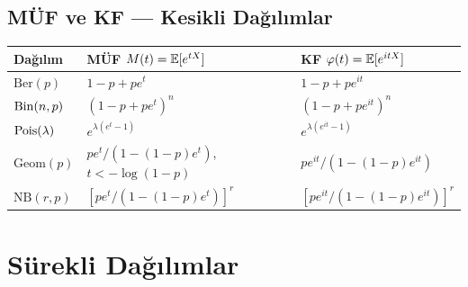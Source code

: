 \subsection{MÜF ve KF — Kesikli Dağılımlar}

\begin{center}
\renewcommand{\arraystretch}{1.5}
\small
\begin{tabular}{p{2.4cm}p{4.5cm}p{4.5cm}}
\hline
\textbf{Dağılım} & \textbf{MÜF} $M(t)=\mathbb{E}[e^{tX}]$ & \textbf{KF} $\varphi(t)=\mathbb{E}[e^{itX}]$ \\
\hline
$\mathrm{Ber}(p)$ & $1-p+pe^t$ & $1-p+pe^{it}$ \\
$\operatorname{Bin}(n,p)$ & $(1-p+pe^t)^n$ & $(1-p+pe^{it})^n$ \\
$\operatorname{Pois}(\lambda)$ & $e^{\lambda(e^t-1)}$ & $e^{\lambda(e^{it}-1)}$ \\
$\mathrm{Geom}(p)$ & $pe^t/(1-(1-p)e^t)$, $t<-\log(1-p)$ & $pe^{it}/(1-(1-p)e^{it})$ \\
$\mathrm{NB}(r,p)$ & $[pe^t/(1-(1-p)e^t)]^r$ & $[pe^{it}/(1-(1-p)e^{it})]^r$ \\
\hline
\end{tabular}
\end{center}

\section{Sürekli Dağılımlar}
\label{app:surekli_dag}

